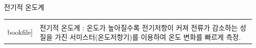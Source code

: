 \begin{frame}[t]{전기적 온도계}
	\begin{tabular}{ll}
		\begin{minipage}[t]{0.5\textwidth}
			\begin{figure}[t]
				\texttt{[image: \\bookfile]}
			\end{figure}
		\end{minipage}	
		&
		\begin{minipage}[t]{0.450\textwidth}
			{\scriptsize 전기적 온도계 : 온도가 높아질수록 전기저항이 커져 전류가 감소하는 성질을 가진 서미스터(온도저항기)를 이용하여 온도 변화를 빠르게 측정.}
		\end{minipage}
	\end{tabular}
\end{frame}



%
%		
%
%

